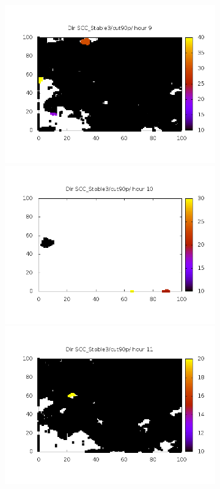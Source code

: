 \documentclass[10pt,a4paper]{article}
\begin{document}
\begin{figure}
\begin{subfigure}[b]{1\textwidth}
\end{subfigure}
\begin{subfigure}[b]{1\textwidth}
\includegraphics[scale=.20]{./img/SCC_Stable3/cut90p/9.png}
\includegraphics[scale=.20]{./img/SCC_Stable3/cut90p/10.png}
\includegraphics[scale=.20]{./img/SCC_Stable3/cut90p/11.png}

\end{subfigure}
\end{figure}
\end{document}
